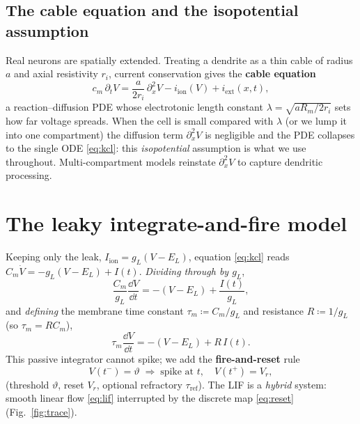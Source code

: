 \documentclass[11pt]{article}
\begin{document}
\subsection{The cable equation and the isopotential assumption}
Real neurons are spatially extended. Treating a dendrite as a thin cable of radius $a$ and axial
resistivity $r_i$, current conservation gives the \textbf{cable equation}
\begin{equation}
  c_m\,\partial_t V=\frac{a}{2r_i}\,\partial_x^2 V-i_{\mathrm{ion}}(V)+i_{\mathrm{ext}}(x,t),
\end{equation}
a reaction--diffusion PDE whose electrotonic length constant $\lambda=\sqrt{aR_m/2r_i}$ sets how far
voltage spreads. When the cell is small compared with $\lambda$ (or we lump it into one
compartment) the diffusion term $\partial_x^2V$ is negligible and the PDE collapses to the single
ODE \eqref{eq:kcl}: this \emph{isopotential} assumption is what we use throughout. Multi-compartment
models reinstate $\partial_x^2V$ to capture dendritic processing.

\section{The leaky integrate-and-fire model}
Keeping only the leak, $I_{\mathrm{ion}}=g_L(V-E_L)$, equation \eqref{eq:kcl} reads
$C_m\dot V=-g_L(V-E_L)+I(t)$. \emph{Dividing through by $g_L$},
\begin{equation}
  \frac{C_m}{g_L}\frac{\dd V}{\dd t}=-(V-E_L)+\frac{I(t)}{g_L},
\end{equation}
and \emph{defining} the membrane time constant $\tau_m\coloneqq C_m/g_L$ and resistance
$R\coloneqq 1/g_L$ (so $\tau_m=RC_m$),
\begin{equation}
  \boxed{\;\tau_m\frac{\dd V}{\dd t}=-(V-E_L)+R\,I(t).\;}
  \label{eq:lif}
\end{equation}
This passive integrator cannot spike; we add the \textbf{fire-and-reset} rule
\begin{equation}
  V(t^-)=\vartheta\;\Rightarrow\;\text{spike at }t,\quad V(t^+)=V_r,
  \label{eq:reset}
\end{equation}
(threshold $\vartheta$, reset $V_r$, optional refractory $\tau_{\mathrm{ref}}$). The LIF is a
\emph{hybrid} system: smooth linear flow \eqref{eq:lif} interrupted by the discrete map
\eqref{eq:reset} (Fig.~\ref{fig:trace}).
\end{document}
